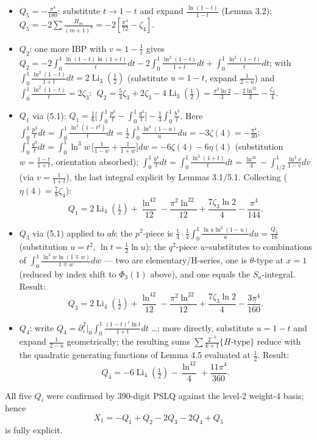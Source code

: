 \documentclass[11pt]{article}
\theoremstyle{remark}
\begin{document}
\begin{itemize}
\item $Q_5=-\frac{\pi^4}{180}$: substitute $t\to1-t$ and expand $\frac{\ln(1-t)}{1-t}$ (Lemma 3.2): $Q_5=-2\sum\frac{H_m}{(m+1)^3}=-2[\frac{\pi^4}{72}-\zeta_4]$.
\item $Q_2$: one more IBP with $v=1-\frac1t$ gives $Q_2=-2\int_0^1\frac{\ln(1-t)\ln(1+t)}{t}dt-2\int_0^1\frac{\ln^2(1-t)}{1+t}dt+\int_0^1\frac{\ln^2(1-t)}{t}dt$; with $\int_0^1\frac{\ln^2(1-t)}{1+t}dt=2\operatorname{Li}_3(\tfrac12)$ (substitute $u=1-t$, expand $\frac{1}{2-u}$) and $\int_0^1\frac{\ln^2(1-t)}{t}=2\zeta_3$: $\;Q_2=\frac54\zeta_3+2\zeta_3-4\operatorname{Li}_3(\tfrac12)=\frac{\pi^2\ln2}{3}-\frac{2\ln^32}{3}-\frac{\zeta_3}{4}$.
\item $Q_1$ via (5.1): $Q_1=\frac16\bigl[\int_0^1\frac{p^3}{t}-\int_0^1\frac{q^3}{t}\bigr]-\frac13\int_0^1\frac{b^3}{t}$. Here $\int_0^1\frac{p^3}{t}dt=\int_0^1\frac{\ln^3(1-t^2)}{t}dt=\frac12\int_0^1\frac{\ln^3(1-u)}{u}du=-3\zeta(4)=-\frac{\pi^4}{30}$; $\int_0^1\frac{q^3}{t}dt=\int_0^1\ln^3w\,\bigl[\tfrac1{1-w}+\tfrac1{1+w}\bigr]dw=-6\zeta(4)-6\eta(4)$ (substitution $w=\frac{1-t}{1+t}$, orientation absorbed); $\int_0^1\frac{b^3}{t}dt=\int_0^1\frac{\ln^3(1+t)}{t}dt=\frac{\ln^42}{4}-\int_{1/2}^1\frac{\ln^3v}{1-v}dv$ (via $v=\frac1{1+t}$), the last integral explicit by Lemmas 3.1/5.1. Collecting ($\eta(4)=\tfrac78\zeta_4$):
\[
Q_1=2\operatorname{Li}_4(\tfrac12)+\frac{\ln^42}{12}-\frac{\pi^2\ln^22}{12}+\frac{7\zeta_3\ln2}{4}-\frac{\pi^4}{144}.
\]
\item $Q_3$ via (5.1) applied to $ab$: the $p^2$-piece is $\frac14\cdot\frac14\int_0^1\frac{\ln u\ln^2(1-u)}{u}du=\frac{Q_5}{16}$ (substitution $u=t^2$, $\ln t=\frac12\ln u$); the $q^2$-piece $w$-substitutes to combinations of $\int_0^1\frac{\ln^2w\ln(1\mp w)}{1\mp w}dw$ --- two are elementary/H-series, one is $\theta$-type at $x=1$ (reduced by index shift to $\Phi_3(1)$ above), and one equals the $S_a$-integral. Result:
\[
Q_3=2\operatorname{Li}_4(\tfrac12)+\frac{\ln^42}{12}-\frac{\pi^2\ln^22}{12}+\frac{7\zeta_3\ln2}{4}-\frac{3\pi^4}{160}.
\]
\item $Q_4$: write $Q_4=\partial_\varepsilon^2\big|_{0}\int_0^1\frac{(1-t)^\varepsilon\ln t}{1+t}dt$ \dots; more directly, substitute $u=1-t$ and expand $\frac1{2-u}$ geometrically; the resulting sums $\sum\frac{2^{-k}}{k+1}\{H\text{-type}\}$ reduce with the quadratic generating functions of Lemma 4.5 evaluated at $\tfrac12$. Result:
\[
Q_4=-6\operatorname{Li}_4(\tfrac12)-\frac{\ln^42}{4}+\frac{11\pi^4}{360}.
\]
\end{itemize}
All five $Q_i$ were confirmed by 390-digit PSLQ against the level-2 weight-4 basis; hence
\[
X_1=-Q_1+Q_2-2Q_3-2Q_4+Q_5
\]
is fully explicit.
\end{document}
